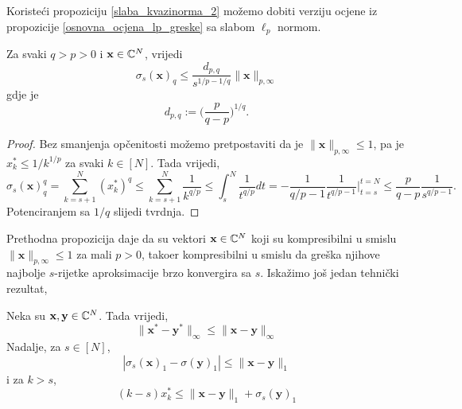\documentclass[a4paper,twoside,12pt]{memoir} %
\newcommand{\vect}[1]{\mathbf{#1}}
\renewcommand{\vec}{\vect}
\newcommand{\norm}[1]{\|{#1}\|}
\begin{document}
Koriste\'ci propoziciju \eqref{slaba_kvazinorma_2} mo\v{z}emo dobiti verziju ocjene iz propozicije \eqref{osnovna_ocjena_lp_greske} sa slabom $\ell_p$ normom.
\begin{prop}
    Za svaki $q>p>0$ i $\vec{x} \in \C^N$, vrijedi
    \begin{equation*}
        \sigma_s(\vec{x})_q \leq \frac{d_{p,q}}{s^{1/p-1/q}}\|\vec{x}\|_{p, \infty}
    \end{equation*}
    gdje je
    \begin{equation*}
        d_{p,q} := \big( \frac{p}{q-p} \big)^{1/q}.
    \end{equation*}
\end{prop}
\begin{proof}
    Bez smanjenja op\v{c}enitosti mo\v{z}emo pretpostaviti da je $\norm{\vec{x}}_{p,\infty} \leq 1$, pa je $x_k^* \leq 1/k^{1/p}$ za svaki $k \in [N]$. Tada vrijedi,
    \begin{equation*}
    \sigma_s(\vec{x})^q_q = \sum_{k=s+1}^{N} (x_k^*)^q \leq \sum_{k=s+1}^N \frac{1}{k^{q/p}} \leq \int_s^N \frac{1}{t^{q/p}} dt = - \frac{1}{q/p-1} \frac{1}{t^{q/p-1}}\bigg\rvert^{t=N}_{t=s} \leq \frac{p}{q-p} \frac{1}{s^{q/p-1}}.
    \end{equation*}
    Potenciranjem sa $1/q$ slijedi tvrdnja.
\end{proof}
Prethodna propozicija daje da su vektori $\vec{x} \in \C^N$ koji su kompresibilni u smislu $\norm{\vec{x}}_{p, \infty} \leq 1$ za mali $p>0$, tako\dj er kompresibilni u smislu da gre\v{s}ka njihove najbolje $s$-rijetke aproksimacije brzo konvergira sa $s$. Iska\v{z}imo jo\v{s} jedan tehni\v{c}ki rezultat,
\begin{lem}
    Neka su $\vec{x}, \vec{y} \in \C^N$. Tada vrijedi,
    \begin{equation} \label{nerastuci_poredak_ocjena_1}
        \norm{\vec{x}^* - \vec{y}^*}_{\infty} \leq \norm{\vec{x} - \vec{y}}_{\infty}
    \end{equation}
    Nadalje, za $s \in [N]$,
    \begin{equation}\label{nerastuci_poredak_ocjena_2}
        |\sigma_s(\vec{x})_1 - \sigma(\vec{y})_1| \leq \norm{\vec{x} - \vec{y}}_1
    \end{equation}
    i za $k>s$,
    \begin{equation}\label{nerastuci_poredak_ocjena_3}
        (k-s)x_k^* \leq \norm{\vec{x} - \vec{y}}_1 + \sigma_s(\vec{y})_1
    \end{equation}
\end{lem}
\end{document}
